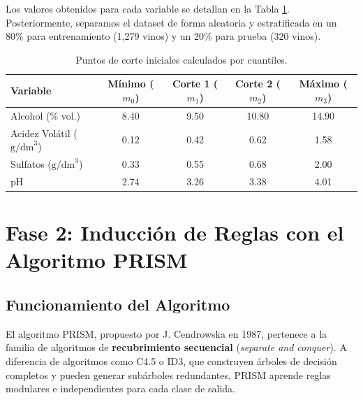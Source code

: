 \documentclass[11pt,a4paper]{article}
\begin{document}
Los valores obtenidos para cada variable se detallan en la Tabla \ref{tab:cortes}. Posteriormente, separamos el dataset de forma aleatoria y estratificada en un 80\% para entrenamiento (1,279 vinos) y un 20\% para prueba (320 vinos).

\begin{table}[H]
\centering
\caption{Puntos de corte iniciales calculados por cuantiles.}
\label{tab:cortes}
\begin{tabular}{lcccc}
\toprule
\textbf{Variable} & \textbf{Mínimo ($m_0$)} & \textbf{Corte 1 ($m_1$)} & \textbf{Corte 2 ($m_2$)} & \textbf{Máximo ($m_3$)} \\
\midrule
Alcohol (\% vol.) & 8.40 & 9.50 & 10.80 & 14.90 \\
Acidez Volátil ($\text{g/dm}^3$) & 0.12 & 0.42 & 0.62 & 1.58 \\
Sulfatos ($\text{g/dm}^3$) & 0.33 & 0.55 & 0.68 & 2.00 \\
pH & 2.74 & 3.26 & 3.38 & 4.01 \\
\bottomrule
\end{tabular}
\end{table}

\section{Fase 2: Inducción de Reglas con el Algoritmo PRISM}

\subsection{Funcionamiento del Algoritmo}
El algoritmo PRISM, propuesto por J. Cendrowska en 1987, pertenece a la familia de algoritmos de \textbf{recubrimiento secuencial} (\textit{separate and conquer}). A diferencia de algoritmos como C4.5 o ID3, que construyen árboles de decisión completos y pueden generar subárboles redundantes, PRISM aprende reglas modulares e independientes para cada clase de salida.
\end{document}
